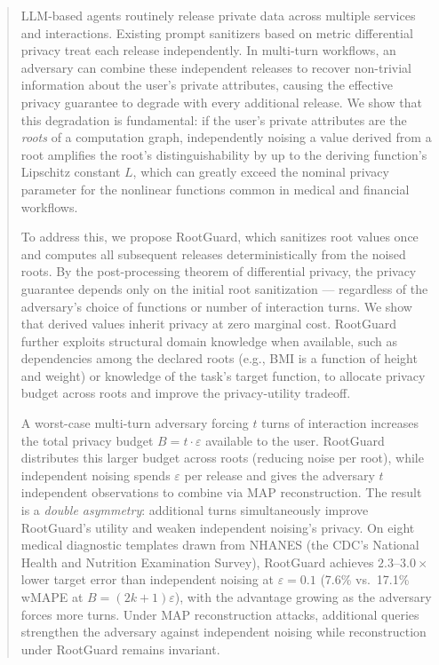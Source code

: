 \documentclass[sigconf,review,anonymous]{acmart}
\theoremstyle{definition}
\begin{document}


\begin{abstract}
LLM-based agents routinely release private data across multiple services and interactions. Existing prompt sanitizers based on metric differential privacy treat each release independently. In multi-turn workflows, an adversary can combine these independent releases to recover non-trivial information about the user's private attributes, causing the effective privacy guarantee to degrade with every additional release. We show that this degradation is fundamental: if the user's private attributes are the \emph{roots} of a computation graph, independently noising a value derived from a root amplifies the root's distinguishability by up to the deriving function's Lipschitz constant $L$, which can greatly exceed the nominal privacy parameter for the nonlinear functions common in medical and financial workflows.

To address this, we propose RootGuard, which sanitizes root values once and computes all subsequent releases deterministically from the noised roots. By the post-processing theorem of differential privacy, the privacy guarantee depends only on the initial root sanitization --- regardless of the adversary's choice of functions or number of interaction turns. We show that derived values inherit privacy at zero marginal cost. RootGuard further exploits structural domain knowledge when available, such as dependencies among the declared roots (e.g., BMI is a function of height and weight) or knowledge of the task's target function, to allocate privacy budget across roots and improve the privacy-utility tradeoff.

A worst-case multi-turn adversary forcing $t$ turns of interaction increases the total privacy budget $B = t \cdot \varepsilon$ available to the user. RootGuard distributes this larger budget across roots (reducing noise per root), while independent noising spends $\varepsilon$ per release and gives the adversary $t$ independent observations to combine via MAP reconstruction. The result is a \emph{double asymmetry}: additional turns simultaneously improve RootGuard's utility and weaken independent noising's privacy. On eight medical diagnostic templates drawn from NHANES (the CDC's National Health and Nutrition Examination Survey), RootGuard achieves $2.3$--$3.0\times$ lower target error than independent noising at $\varepsilon = 0.1$ (7.6\% vs.\ 17.1\% wMAPE at $B = (2k{+}1)\varepsilon$), with the advantage growing as the adversary forces more turns. Under MAP reconstruction attacks, additional queries strengthen the adversary against independent noising while reconstruction under RootGuard remains invariant.
\end{abstract}
\end{document}

